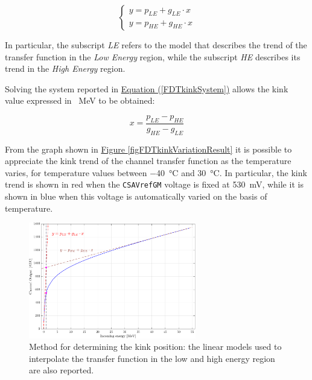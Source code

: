 \begin{equation}
    \begin{cases}
        y = p_{LE} + g_{LE} \cdot x \\
        y = p_{HE} + g_{HE} \cdot x
    \end{cases}
    \label{FDTkinkSystem}
\end{equation}

\noindent
In particular, the subscript \textit{LE} refers to the model that describes the trend of the transfer function in the \textit{Low Energy} region, while the subscript \textit{HE} describes its trend in the \textit{High Energy} region. 

\par
Solving the system reported in \hyperref[FDTkinkSystem]{Equation (\ref{FDTkinkSystem})} allows the kink value expressed in \SI{}{\mega\electronvolt} to be obtained:

\begin{equation}
    x = \frac{p_{LE} - p_{HE}}{g_{HE} - g_{LE}}
\end{equation}

\par
From the graph shown in \hyperref[figFDTkinkVariationResult]{Figure \ref{figFDTkinkVariationResult}} it is possible to appreciate the kink trend of the channel transfer function as the temperature varies, for temperature values between \SI{-40}{\celsius} and \SI{30}{\celsius}. In particular, the kink trend is shown in red when the \texttt{CSAVrefGM} voltage is fixed at \SI{530}{\milli\volt}, while it is shown in blue when this voltage is automatically varied on the basis of temperature.

\begin{figure}[h!]
    \centering
    \includegraphics[width=0.65\textwidth]{Images/chap1/results/FDT/fdt_calcolo_kink.pdf}
    \caption{Method for determining the kink position: the linear models used to interpolate the transfer function in the low and high energy region are also reported.}
    \label{figFDTkinkVariation}
\end{figure}

